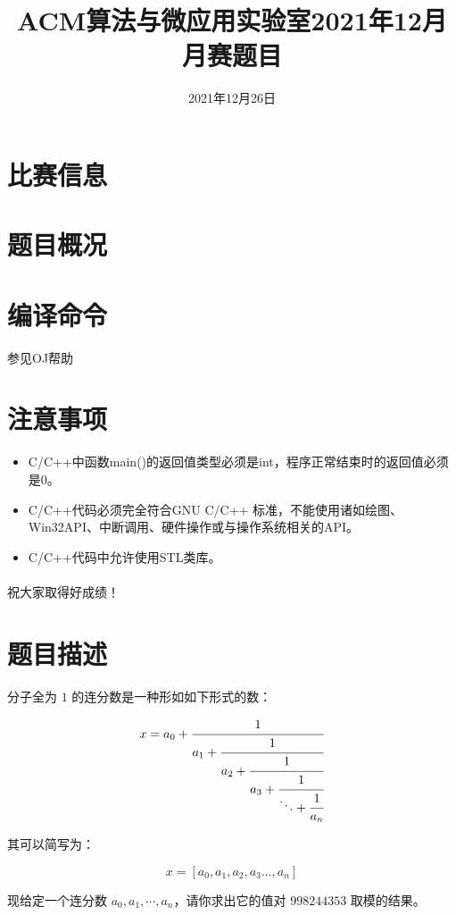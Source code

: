 \documentclass{ctpro}
\title{ACM算法与微应用实验室2021年12月月赛题目}
\date{2021年12月26日}
\begin{document}
\maketitle
{}

\section*{比赛信息}

\section*{题目概况}
\problemtab

\section*{编译命令}
参见OJ帮助

\section*{注意事项}
\begin{itemize}
	\item C/C++中函数main()的返回值类型必须是int，程序正常结束时的返回值必须是0。
	\item C/C++代码必须完全符合GNU C/C++ 标准，不能使用诸如绘图、Win32API、中断调用、硬件操作或与操作系统相关的API。
	\item C/C++代码中允许使用STL类库。
\end{itemize}

\paragraph*{} 祝大家取得好成绩！

\MakeShortVerb{\|}
\makeproblem
\section*{题目描述}
分子全为 $1$ 的连分数是一种形如如下形式的数：

$$
	x=a_0
	+\cfrac{1}{a_1
		+\cfrac{1}{a_2
			+\cfrac{1}{a_3
				+\cfrac{1}{\ddots
					+\cfrac{1}{a_n}}}}}
$$

其可以简写为：

$$x=[a_0,a_1,a_2,a_3\dots,a_n]$$

现给定一个连分数 $a_0, a_1, \cdots, a_n$，请你求出它的值对 $998244353$ 取模的结果。
\end{document}

